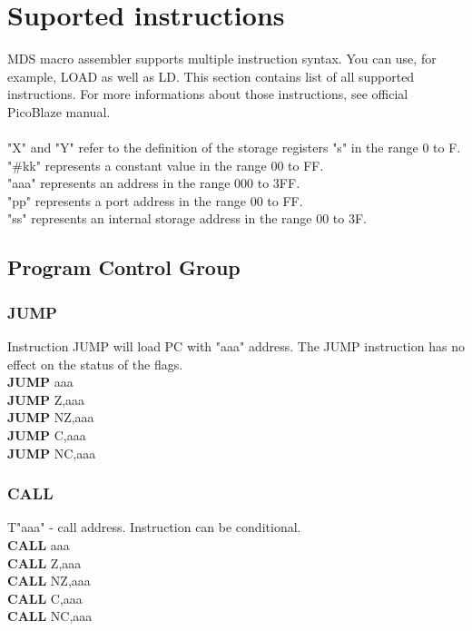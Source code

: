 \section{Suported instructions}
    MDS macro assembler supports multiple instruction syntax. You can use, for example, LOAD as well as LD. This section contains list of all supported instructions. For more informations about those instructions, see official PicoBlaze manual.\\\\
    "X" and "Y" refer to the definition of the storage registers "s" in the range 0 to F.\\
    "\#kk" represents a constant value in the range 00 to FF.\\
    "aaa" represents an address in the range 000 to 3FF.\\
    "pp" represents a port address in the range 00 to FF.\\
    "ss" represents an internal storage address in the range 00 to 3F.\\

    \subsection{Program Control Group}
        \subsubsection{JUMP}
            Instruction JUMP will load PC with "aaa" address. The JUMP instruction has no effect on the status of the flags.\\
            \textbf{JUMP} aaa\\
            \textbf{JUMP} Z,aaa\\
            \textbf{JUMP} NZ,aaa\\
            \textbf{JUMP} C,aaa\\
            \textbf{JUMP} NC,aaa\\

        \subsubsection{CALL}
            T"aaa" - call address. Instruction can be conditional.\\
            \textbf{CALL} aaa\\
            \textbf{CALL} Z,aaa\\
            \textbf{CALL} NZ,aaa\\
            \textbf{CALL} C,aaa\\
            \textbf{CALL} NC,aaa\\

